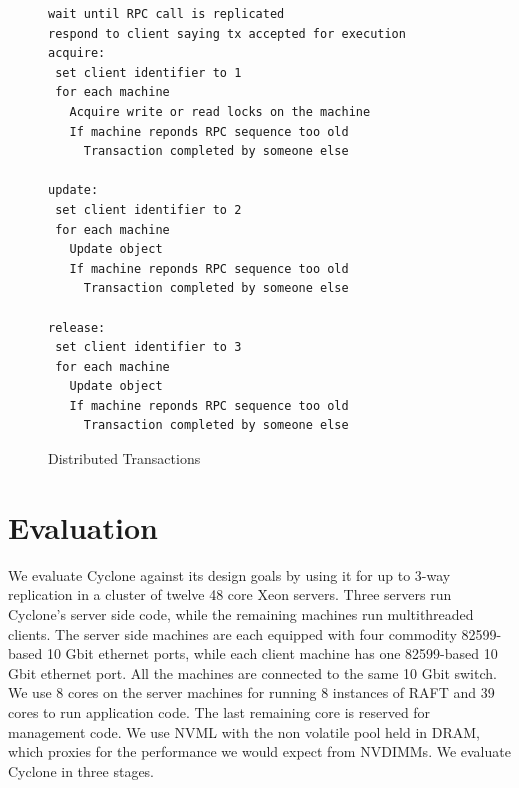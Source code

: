 \documentclass[letterpaper,twocolumn,10pt]{article}
\begin{document}
\begin{figure}
{ \scriptsize
\begin{verbatim}
wait until RPC call is replicated
respond to client saying tx accepted for execution
acquire:
 set client identifier to 1
 for each machine
   Acquire write or read locks on the machine
   If machine reponds RPC sequence too old
     Transaction completed by someone else

update:
 set client identifier to 2
 for each machine
   Update object
   If machine reponds RPC sequence too old
     Transaction completed by someone else
 
release:
 set client identifier to 3
 for each machine
   Update object
   If machine reponds RPC sequence too old
     Transaction completed by someone else
\end{verbatim}
}
\vspace{-0.22in}
\caption{Distributed Transactions}
\label{fig:dist_tx}
\end{figure}

\section{Evaluation}
We evaluate Cyclone against its design goals by using it for up to 3-way
replication in a cluster of twelve 48 core Xeon servers. Three servers run
Cyclone's server side code, while the remaining machines run multithreaded
clients. The server side machines are each equipped with four commodity
82599-based 10 Gbit ethernet ports, while each client machine has one
82599-based 10 Gbit ethernet port. All the machines are connected to the same 10
Gbit switch. We use 8 cores on the server machines for running 8 instances of
RAFT and 39 cores to run application code. The last remaining core is reserved
for management code. We use NVML with the non volatile pool held in DRAM, which
proxies for the performance we would expect from NVDIMMs. We evaluate Cyclone in
three stages.
\end{document}
